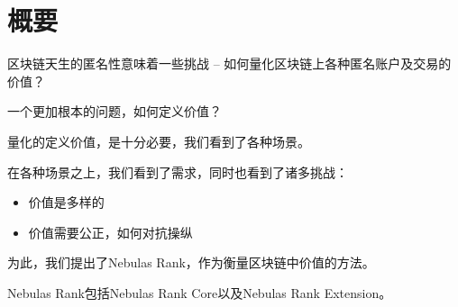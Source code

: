 \section{概要}


区块链天生的匿名性意味着一些挑战 -- 如何量化区块链上各种匿名账户及交易的价值？

一个更加根本的问题，如何定义价值？

量化的定义价值，是十分必要，我们看到了各种场景。

在各种场景之上，我们看到了需求，同时也看到了诸多挑战：
\begin{itemize}
\item 价值是多样的
\item 价值需要公正，如何对抗操纵
\end{itemize}

为此，我们提出了Nebulas Rank，作为衡量区块链中价值的方法。

Nebulas Rank包括Nebulas Rank Core以及Nebulas Rank Extension。

